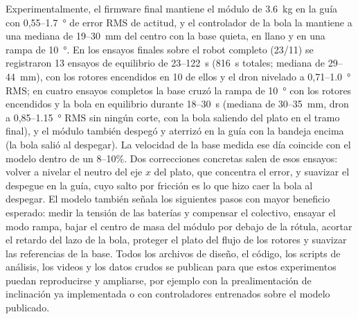 Experimentalmente, el firmware final mantiene el módulo de \SI{3.6}{\kilo\gram} en la guía con 0,55--\SI{1.7}{\degree} de error RMS de actitud, y el controlador de la bola la mantiene a una mediana de 19--\SI{30}{\milli\metre} del centro con la base quieta, en llano y en una rampa de \SI{10}{\degree}. En los ensayos finales sobre el robot completo (23/11) se registraron 13 ensayos de equilibrio de 23--\SI{122}{\second} (\SI{816}{\second} totales; mediana de 29--\SI{44}{\milli\metre}), con los rotores encendidos en 10 de ellos y el dron nivelado a 0,71--\SI{1.0}{\degree} RMS; en cuatro ensayos completos la base cruzó la rampa de \SI{10}{\degree} con los rotores encendidos y la bola en equilibrio durante 18--\SI{30}{\second} (mediana de 30--\SI{35}{\milli\metre}, dron a 0,85--\SI{1.15}{\degree} RMS sin ningún corte, con la bola saliendo del plato en el tramo final), y el módulo también despegó y aterrizó en la guía con la bandeja encima (la bola salió al despegar). La velocidad de la base medida ese día coincide con el modelo dentro de un 8--10\%. Dos correcciones concretas salen de esos ensayos: volver a nivelar el neutro del eje $x$ del plato, que concentra el error, y suavizar el despegue en la guía, cuyo salto por fricción es lo que hizo caer la bola al despegar. El modelo también señala los siguientes pasos con mayor beneficio esperado: medir la tensión de las baterías y compensar el colectivo, ensayar el modo rampa, bajar el centro de masa del módulo por debajo de la rótula, acortar el retardo del lazo de la bola, proteger el plato del flujo de los rotores y suavizar las referencias de la base. Todos los archivos de diseño, el código, los scripts de análisis, los videos y los datos crudos se publican para que estos experimentos puedan reproducirse y ampliarse, por ejemplo con la prealimentación de inclinación ya implementada o con controladores entrenados sobre el modelo publicado.
